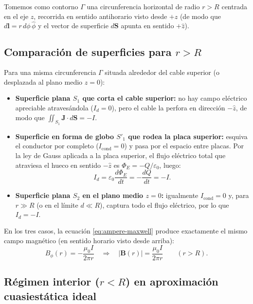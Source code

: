 \documentclass[11pt]{article}
\begin{document}
Tomemos como contorno $\Gamma$ una circunferencia horizontal de radio $r > R$ centrada en el eje $z$, recorrida en sentido antihorario visto desde $+z$ (de modo que $d\mathbf{l} = r\,d\phi\,\hat{\phi}$ y el vector de superficie $d\mathbf{S}$ apunta en sentido $+\hat{z}$).

\subsection{Comparación de superficies para $r > R$}

Para una misma circunferencia $\Gamma$ situada alrededor del cable superior (o desplazada al plano medio $z = 0$):
\begin{itemize}
    \item \textbf{Superficie plana $S_1$ que corta el cable superior:} no hay campo eléctrico apreciable atravesándola ($I_d = 0$), pero el cable la perfora en dirección $-\hat{z}$, de modo que $\iint_{S_1} \mathbf{J} \cdot d\mathbf{S} = -I$.
    \item \textbf{Superficie en forma de globo $S'_1$ que rodea la placa superior:} esquiva el conductor por completo ($I_{\mathrm{cond}} = 0$) y pasa por el espacio entre placas. Por la ley de Gauss aplicada a la placa superior, el flujo eléctrico total que atraviesa el hueco en sentido $-\hat{z}$ es $\Phi_E = -Q/\varepsilon_0$, luego:
    \begin{equation}
        I_d = \varepsilon_0 \frac{d\Phi_E}{dt} = -\frac{dQ}{dt} = -I.
    \end{equation}
    \item \textbf{Superficie plana $S_2$ en el plano medio $z = 0$:} igualmente $I_{\mathrm{cond}} = 0$ y, para $r \gg R$ (o en el límite $d \ll R$), captura todo el flujo eléctrico, por lo que $I_d = -I$.
\end{itemize}

En los tres casos, la ecuación \eqref{eq:ampere-maxwell} produce exactamente el mismo campo magnético (en sentido horario visto desde arriba):
\begin{equation}
    B_\phi(r) = -\frac{\mu_0 I}{2\pi r} \quad \Longrightarrow \quad |\mathbf{B}(r)| = \frac{\mu_0 I}{2\pi r} \qquad (r > R).
\end{equation}

\subsection{Régimen interior ($r < R$) en aproximación cuasiestática ideal}
\end{document}
